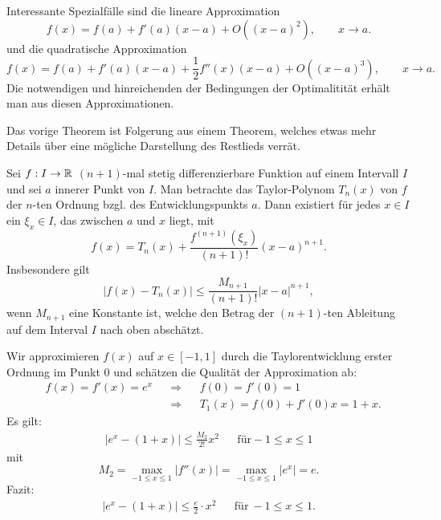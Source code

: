 \begin{bem}
	Interessante Spezialfälle sind die lineare Approximation
	\[
		f(x) = f(a)+ f'(a) (x-a) + O((x-a)^2), \qquad x \to a. 
	\]
	und die quadratische Approximation
	\[
		f(x) = f(a) + f'(a)(x-a) + \frac{1}{2} f''(x) (x-a) + O((x-a)^3), \qquad x \to a. 
	\]
	Die notwendigen und hinreichenden der Bedingungen der Optimalitität erhält man aus diesen Approximationen. 
\end{bem}


\begin{bem} 
	Das vorige Theorem ist Folgerung aus einem Theorem, welches etwas mehr Details über eine mögliche Darstellung des Restlieds verrät. 
\end{bem} 

\begin{thm} 
	Sei $f: I \to \mathbb{R}$ $(n+1)$-mal stetig differenzierbare Funktion auf einem Intervall $I$ und sei $a$ innerer Punkt von $I$. Man betrachte das Taylor-Polynom $T_n(x)$ von $f$ der $n$-ten Ordnung bzgl. des Entwicklungspunkts $a$. Dann existiert für jedes $x \in I$ ein $\xi_x \in I$, das zwischen $a$ und $x$ liegt, mit 
	\[
		f(x)  = T_n(x) + \frac{f^{(n+1)}(\xi_x)}{(n+1)!} (x-a)^{n+1}. 
	\]
	Insbesondere gilt 
	\[
		|f(x) - T_n(x)| \le \frac{M_{n+1}}{(n+1)!} |x-a|^{n+1},
	\]
	wenn $M_{n+1}$ eine Konstante ist, welche den Betrag der $(n+1)$-ten Ableitung auf dem Interval $I$ nach oben abschätzt. 
\end{thm} 

\begin{bsp}
	Wir approximieren $f(x)$ auf $x \in [-1,1]$ durch die Taylorentwicklung erster Ordnung im Punkt $0$ und schätzen die Qualität der Approximation ab: 
	\begin{align*}
		& f(x)  = f'(x) = e^x & & \Longrightarrow & & f(0)  = f'(0) = 1  \\ 
		& & & \Longrightarrow &  & T_1(x) = f(0) + f'(0) x = 1 + x. 
	\end{align*}
	Es gilt: 
	\begin{align*}
		| e^x - (1+x) | \le \frac{M_2}{2!} x^2 & & \text{für} -1 \le x \le 1
	\end{align*}
	mit 
	\[
		M_2 = \max_{-1 \le x \le 1} |f''(x)| = \max_{-1 \le x \le 1} | e^x | = e.
	\]
	Fazit: 
	\begin{align*}
		|e^x - (1+x)| \le \frac{e}{2} \cdot x^2 & & \text{für} \ -1 \le x \le 1.
	\end{align*}
\end{bsp} 

